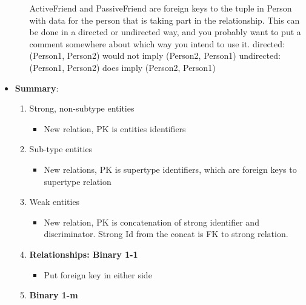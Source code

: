 \documentclass{report}
\begin{document}
\begin{itemize}
\begin{enumerate}
\begin{center}
                    \end{center}
                    \bigbreak \noindent 
                    ActiveFriend and PassiveFriend are foreign keys to the tuple in Person with data for the person that is taking part in
                    the relationship. This can be done in a directed or undirected way, and you probably want to put a comment
                    somewhere about which way you intend to use it.
                    \bigbreak \noindent 
                    directed: (Person1, Person2) would not imply (Person2, Person1)
                    \bigbreak \noindent 
                    undirected: (Person1, Person2) does imply (Person2, Person1)
                    \bigbreak \noindent 
            \end{enumerate}
        \item \textbf{Summary}:
            \begin{enumerate}
                \item Strong, non-subtype entities
                    \begin{itemize}
                        \item New relation, PK is entities identifiers
                    \end{itemize}
                \item Sub-type entities
                    \begin{itemize}
                        \item New relations, PK is supertype identifiers, which are foreign keys to supertype relation
                    \end{itemize}
                \item Weak entities
                    \begin{itemize}
                        \item New relation, PK is concatenation of strong identifier and discriminator. Strong Id from the concat is FK to strong relation.
                    \end{itemize}
                \item \textbf{Relationships: Binary 1-1}
                    \begin{itemize}
                        \item Put foreign key in either side
                    \end{itemize}
                \item \textbf{Binary 1-m}
                    \begin{itemize}

\end{itemize}
\end{enumerate}
\end{itemize}
\end{document}
